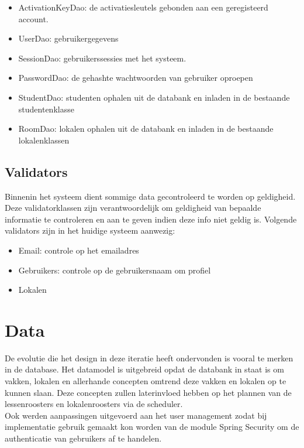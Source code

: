 \begin{itemize}
	\item ActivationKeyDao: de activatiesleutels gebonden aan een geregisteerd account. 
	\item UserDao: gebruikergegevens
	\item SessionDao: gebruikerssessies met het systeem.
	\item PasswordDao: de gehashte wachtwoorden van gebruiker oproepen
	\item StudentDao: studenten ophalen uit de databank en inladen in de bestaande studentenklasse
	\item RoomDao: lokalen ophalen uit de databank en inladen in de bestaande lokalenklassen
\end{itemize}

\subsection{Validators}
\label{subsec:validators}

Binnenin het systeem dient sommige data gecontroleerd te worden op geldigheid. 
Deze validatorklassen zijn verantwoordelijk om geldigheid van bepaalde informatie te controleren en aan te geven indien deze info niet geldig is. 
Volgende validators zijn in het huidige systeem aanwezig:

\begin{itemize}
	\item Email: controle op het emailadres
	\item Gebruikers: controle op de gebruikersnaam om profiel
	\item Lokalen
\end{itemize}
\section{Data}
\label{sec:data}
De evolutie die het design in deze iteratie heeft ondervonden is vooral te merken in de database.
Het datamodel is uitgebreid opdat de databank in staat is om vakken, lokalen en allerhande concepten omtrend deze vakken en lokalen op te kunnen slaan. Deze concepten zullen laterinvloed hebben op het plannen van de lessenroosters en lokalenroosters via de scheduler.\\

Ook werden aanpassingen uitgevoerd aan het user management zodat bij implementatie gebruik gemaakt kon worden van de module Spring Security\cite{spring-security} om de authenticatie van gebruikers af te handelen.\\

